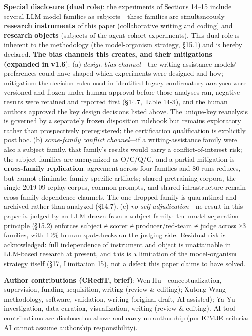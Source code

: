 \documentclass[
  11pt]{article}
\begin{document}
\textbf{Special disclosure (dual role)}: the experiments of Sections
14--15 include several LLM model families as subjects---these families
are simultaneously \textbf{research instruments} of this paper
(collaborative writing and coding) and \textbf{research objects}
(subjects of the agent-cohort experiments). This dual role is inherent
to the methodology (the model-organism strategy, §15.1) and is hereby
declared. \textbf{The bias channels this creates, and their mitigations
(expanded in v1.6)}: (a) \emph{design-bias channel}---the
writing-assistance models' preferences could have shaped which
experiments were designed and how; mitigation: the decision rules used
in identified legacy confirmatory analyses were versioned and frozen
under human approval before those analyses ran, negative results were
retained and reported first (§14.7, Table 14-3), and the human authors
approved the key design decisions listed above. The unique-key
reanalysis is governed by a separately frozen disposition rulebook but
remains exploratory rather than prospectively preregistered; the
certification qualification is explicitly post hoc. (b)
\emph{same-family conflict channel}---if a writing-assistance family
were also a subject family, that family's results would carry a
conflict-of-interest risk; the subject families are anonymized as
O/C/Q/G, and a partial mitigation is \textbf{cross-family replication}:
agreement across four families and 80 runs reduces, but cannot
eliminate, family-specific artifacts; shared pretraining corpora, the
single 2019-09 replay corpus, common prompts, and shared infrastructure
remain cross-family dependence channels. The one dropped family is
quarantined and archived rather than analyzed (§14.7). (c) \emph{no
self-adjudication}---no result in this paper is judged by an LLM drawn
from a subject family: the model-separation principle (§15.2) enforces
subject ≠ scorer ≠ producer/red-team ≠ judge across ≥3 families, with
10\% human spot-checks on the judging side. Residual risk is
acknowledged: full independence of instrument and object is unattainable
in LLM-based research at present, and this is a limitation of the
model-organism strategy itself (§17, Limitation 15), not a defect this
paper claims to have solved.

\textbf{Author contributions (CRediT, brief)}: Wen
Hu---conceptualization, supervision, funding acquisition, writing
(review \& editing); Xutong Wang---methodology, software, validation,
writing (original draft, AI-assisted); Ya Yu---investigation, data
curation, visualization, writing (review \& editing). AI-tool
contributions are disclosed as above and carry no authorship (per ICMJE
criteria: AI cannot assume authorship responsibility).
\end{document}
